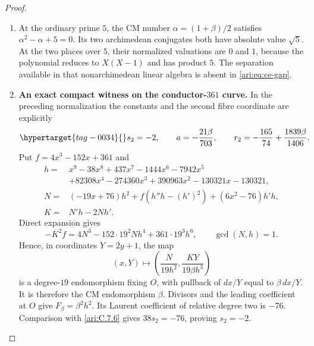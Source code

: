 \begin{proof}
\begin{enumerate}[label=\arabic*.,leftmargin=*]
\item At the ordinary prime $5$, the CM number $\alpha=(1+\beta)/2$ satisfies
$\alpha^2-\alpha+5=0$. Its two archimedean conjugates
both have absolute value $\sqrt5$. At the two places over
$5$, their normalized valuations are $0$ and $1$, because
the polynomial reduces to $X(X-1)$ and has product $5$.
The separation available in that nonarchimedean linear
algebra is absent in \eqref{ari:eq:ce-gap}.

\item \textbf{An exact compact witness on the conductor-$361$ curve.}
In the preceding normalization the constants and the second
fibre coordinate are explicitly
\begin{equation}\hypertarget{tag-0034}{}\label{ari:eq:ce-explicit-witness}
 s_2=-2,\qquad a=-\frac{21\beta}{703},\qquad
 r_2=-\frac{165}{74}+\frac{1839\beta}{1406}.
\end{equation}
Put $f=4x^3-152x+361$ and
\[
 \begin{aligned}
 h={}&x^9-38x^8+437x^7-1444x^6-7942x^5\\
     &+82308x^4-274360x^3+390963x^2-130321x-130321,\\
 N={}&(-19x+76)h^2+f(h''h-(h')^2)+(6x^2-76)h'h,\\
 K={}&N'h-2Nh'.
 \end{aligned}
\]
Direct expansion gives
\[
 -K^2f=4N^3-152\cdot19^2Nh^4+361\cdot19^3h^6,
 \qquad \gcd(N,h)=1.
\]
Hence, in coordinates $Y=2y+1$, the map
\[
 (x,Y)\longmapsto
 \left(\frac{N}{19h^2},\frac{KY}{19\beta h^3}\right)
\]
is a degree-$19$ endomorphism fixing $O$, with pullback of
$dx/Y$ equal to $\beta\,dx/Y$. It is therefore the CM
endomorphism $\beta$. Divisors and the leading coefficient
at $O$ give $F_\beta=\beta^2h^2$. Its Laurent coefficient
of relative degree two is $-76$. Comparison with \ref{ari:C.7.6}
gives $38s_2=-76$, proving $s_2=-2$.


\end{enumerate}
\end{proof}
